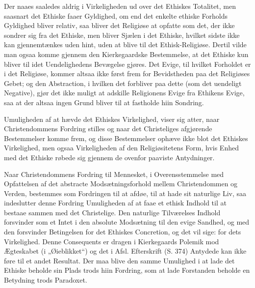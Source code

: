 \documentclass[12pt,a4paper]{book}
\newcommand{\opage}[1]{\marginnote{\footnotesize\textit{[#1]}}}
\begin{document}
Der naaes saaledes aldrig i Virkeligheden ud over det Ethiskes Totalitet, men saasnart det
Ethiske faaer Gyldighed, om end det enkelte ethiske Forholds Gyldighed bliver relativ, saa bliver
det Religiøse at opfatte som det, der ikke sondrer sig fra det Ethiske, men bliver Sjælen i det
Ethiske, hvilket sidste ikke kan gjennemtænkes uden hint, uden at blive til det Ethisk-Religiøse.
Dertil vilde man ogsaa komme gjennem den Kierkegaardske Bestemmelse, at det Ethiske kun bliver
til idet Uendelighedens Bevægelse gjøres. Det Evige, til hvilket Forholdet er i det Religiøse,
kommer altsaa ikke først frem for Bevidstheden paa det Religiøses Gebet; og den Abstraction, i
hvilken det forbliver paa dette (som det uendeligt Negative), gjør det ikke muligt at adskille
Religionens Evige fra Ethikens Evige, saa at der altsaa ingen Grund bliver til at fastholde hiin
Sondring.

Umuligheden af at hævde det Ethiskes Virkelighed, viser sig atter, naar Christendommens Fordring
stilles og naar det Christeliges afgjørende Bestemmelser komme frem, og disse Bestemmelser ophæve
ikke blot det Ethiskes Virkelighed, men ogsaa Virkeligheden af den Religiøsitetens Form, hvis
Enhed med det Ethiske røbede sig gjennem de ovenfor paaviste Antydninger.

\opage{223}Naar Christendommens Fordring til Mennesket, i Overensstemmelse med Opfattelsen af det abstracte
Modsætningsforhold mellem Christendommen og Verden, bestemmes som Fordringen til at afdøe, til at
hade sit naturlige Liv, saa indeslutter denne Fordring Umuligheden af at faae et ethisk Indhold
til at bestaae sammen med det Christelige. Den naturlige Tilværelses Indhold forsvinder som et
Intet i den absolute Modsætning til den evige Sandhed, og med den forsvinder Betingelsen for det
Ethiskes Concretion, og det vil sige: for dets Virkelighed. Denne Consequents er dragen i
Kierkegaards Polemik mod Ægteskabet (i „Øieblikket“) og det i Afsl. Efterskrift (S. 374) Antydede
kan ikke føre til et andet Resultat. Der maa blive den samme Umulighed i at lade det Ethiske
beholde sin Plads trods hiin Fordring, som at lade Forstanden beholde en Betydning trods
Paradoxet.
\end{document}
